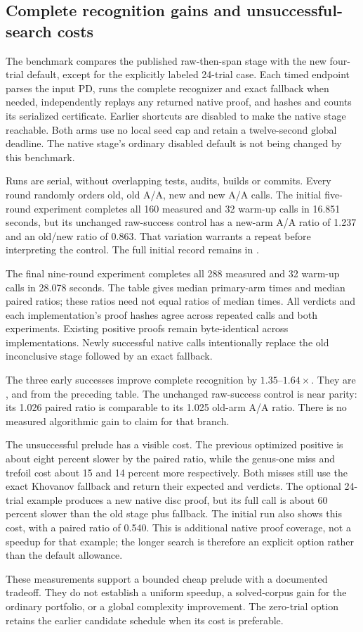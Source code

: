 \subsection{Complete recognition gains and unsuccessful-search costs}

The benchmark compares the published raw-then-span stage with the new
four-trial default, except for the explicitly labeled 24-trial case. Each
timed endpoint parses the input PD, runs the complete recognizer and exact
fallback when needed, independently replays any returned native proof,
and hashes and counts its serialized certificate. Earlier shortcuts are
disabled to make the native stage reachable. Both arms use no local seed
cap and retain a twelve-second global deadline. The native stage's
ordinary disabled default is not being changed by this benchmark.

Runs are serial, without overlapping tests, audits, builds or commits.
Every round randomly orders old, old A/A, new and new A/A calls. The initial
five-round experiment completes all 160 measured and 32 warm-up calls in
16.851 seconds, but its unchanged raw-success control has a new-arm A/A
ratio of 1.237 and an old/new ratio of 0.863. That variation warrants a
repeat before interpreting the control. The full initial record remains
in .

The final nine-round experiment completes all 288 measured and 32 warm-up
calls in 28.078 seconds. The table gives median primary-arm times and
median paired ratios; these ratios need not equal ratios of median times.
All verdicts and each implementation's proof hashes agree across repeated
calls and both experiments. Existing positive proofs remain byte-identical
across implementations. Newly successful native calls intentionally replace
the old inconclusive stage followed by an exact fallback.

\begin{center}
\small
\end{center}

The three early successes improve complete recognition by
$1.35$--$1.64\times$. They are ,  and
 from the preceding table. The unchanged raw-success
control is near parity: its 1.026 paired ratio is comparable to its 1.025
old-arm A/A ratio. There is no measured algorithmic gain to claim for
that branch.

The unsuccessful prelude has a visible cost. The previous optimized
positive is about eight percent slower by the paired ratio, while the
genus-one miss and trefoil cost about 15 and 14 percent more respectively.
Both misses still use the exact Khovanov fallback and return their expected
 and  verdicts. The optional 24-trial example
produces a new native disc proof, but its full call is about 60 percent
slower than the old stage plus fallback. The initial run also shows this
cost, with a paired ratio of 0.540. This is additional native proof
coverage, not a speedup for that example; the longer search is therefore
an explicit option rather than the default allowance.

These measurements support a bounded cheap prelude with a documented
tradeoff. They do not establish a uniform speedup, a solved-corpus gain for
the ordinary portfolio, or a global complexity improvement. The zero-trial
option retains the earlier candidate schedule when its cost is preferable.

